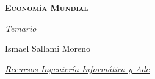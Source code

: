 \documentclass[12pt]{book} %
\begin{document}
\begin{titlepage}
\begin{center}
        {\Huge \bfseries\scshape Economía Mundial \par}
        \vspace{0.5cm}
        {\Large \itshape Temario \par}
        \vspace{0.5cm}


        \vfill
        

        \begin{flushright}
            {Ismael Sallami Moreno \par}
            {\small \itshape \href{https://elblogdeismael.github.io}{Recursos Ingeniería Informática y Ade} \par}
        \end{flushright}
        \vspace{0.3cm}
        
        
    \end{center}
    
    \restoregeometry
\end{titlepage}


\thispagestyle{empty} %
\clearpage

\tableofcontents
\clearpage

%
%

\end{document}
